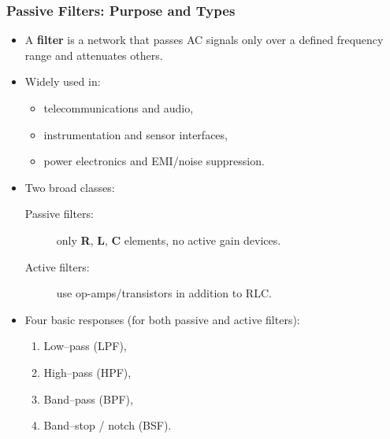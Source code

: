 \begin{frame}
	\frametitle{Passive Filters: Purpose and Types}
	\begin{itemize}
		\item A \textbf{filter} is a network that passes AC signals only over a defined frequency range and attenuates others.
		\item Widely used in:
		\begin{itemize}
			\item telecommunications and audio,
			\item instrumentation and sensor interfaces,
			\item power electronics and EMI/noise suppression.
		\end{itemize}
		\item Two broad classes:
		\begin{description}
			\item[Passive filters:] only \textbf{R}, \textbf{L}, \textbf{C} elements, no active gain devices.
			\item[Active filters:] use op-amps/transistors in addition to RLC.
		\end{description}
		\item Four basic responses (for both passive and active filters):
		\begin{enumerate}
			\item Low–pass (LPF),
			\item High–pass (HPF),
			\item Band–pass (BPF),
			\item Band–stop / notch (BSF).
		\end{enumerate}
	\end{itemize}
\end{frame}
